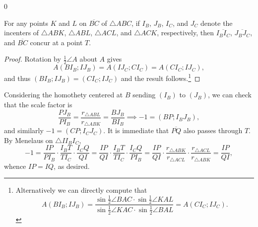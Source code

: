 \setcounter{boxlemma}0
\begin{boxlemma}
    For any points $K$ and $L$ on $\overline{BC}$ of $\triangle ABC$, if $I_B$, $J_B$, $I_C$, and $J_C$ denote the incenters of $\triangle ABK$, $\triangle ABL$, $\triangle ACL$, and $\triangle ACK$, respectively, then $\overline{I_BI_C}$, $\overline{J_BJ_C}$, and $\overline{BC}$ concur at a point $T$.
\end{boxlemma}
\begin{proof}
    Rotation by $\tfrac12\angle A$ about $A$ gives \[A(BI_B;IJ_B)=A(IJ_C;CI_C)=A(CI_C;IJ_C),\]
    and thus $(BI_B;IJ_B)=(CI_C;IJ_C)$ and the result follows.\footnote{Alternatively we can directly compute that $$A(BI_B;IJ_B)=\frac{\sin\tfrac12\angle BAC\cdot\sin\tfrac12\angle KAL}{\sin\tfrac12\angle KAC\cdot\sin\tfrac12\angle BAL}=A(CI_C;IJ_C).$$}
\end{proof}

Considering the homothety centered at $B$ sending $(I_B)$ to $(J_B)$, we can check that the scale factor is \[\frac{PJ_B}{PI_B}=\frac{r_{\triangle ABL}}{r_{\triangle ABK}}=\frac{BJ_B}{BI_B}\implies -1=(BP;I_BJ_B),\]
and similarly $-1=(CP;I_CJ_C)$. It is immediate that $\overline{PQ}$ also passes through $T$. By Menelaus on $\triangle II_BI_C$, \[-1=\frac{IP}{PI_B}\cdot\frac{I_BT}{TI_C}\cdot\frac{I_CQ}{QI}=\frac{IP}{QI}\cdot\frac{I_BT}{TI_C}\cdot\frac{I_CQ}{PI_B}=\frac{IP}{QI}\cdot\frac{r_{\triangle ABK}}{r_{\triangle ACL}}\cdot\frac{r_{\triangle ACL}}{r_{\triangle ABK}}=\frac{IP}{QI},\]
whence $IP=IQ$, as desired.

